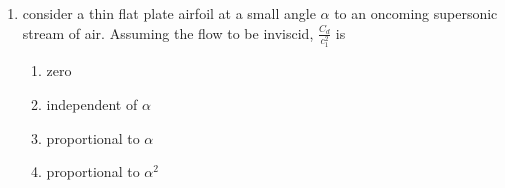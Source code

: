 \documentclass[journal,12pt,onecolumn]{IEEEtran}
\theoremstyle{remark}
\begin{document}
\begin{enumerate}
\item consider a thin flat plate airfoil at a small angle $\alpha$ to an oncoming supersonic stream of air. Assuming the flow to be inviscid, $\frac{C_d}{c_1^2}$ is
\begin{enumerate}
    \item zero
    \item independent of $\alpha$
    \item proportional to $\alpha$
    \item proportional to $\alpha^2$ \\
\end{enumerate}

\end{enumerate}
\end{document}

